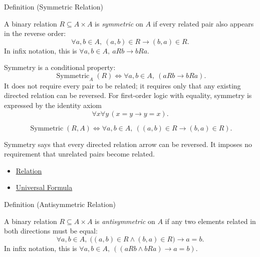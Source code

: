\begin{definitionbox}{Definition (Symmetric Relation)}
\begin{definition}\label{def:symmetric}
A binary relation $R\subseteq A\times A$ is \emph{symmetric} on $A$ if every
related pair also appears in the reverse order:
\[
  \forall a,b\in A,\ (a,b)\in R \rightarrow (b,a)\in R.
\]
In infix notation, this is $\forall a,b\in A,\ aRb\rightarrow bRa$.
\end{definition}
\end{definitionbox}


\begin{remark*}
Symmetry is a conditional property:
\[
  \operatorname{Symmetric}_A(R)
  \iff
  \forall a,b\in A,\ (aRb\rightarrow bRa).
\]
It does not require every pair to be related; it requires only that any
existing directed relation can be reversed. For first-order logic with
equality, symmetry is expressed by the identity axiom
\[
  \forall x\forall y\,(x=y\rightarrow y=x).
\]
\end{remark*}

\begin{remark*}
\[
  \operatorname{Symmetric}(R,A)
  \iff
  \forall a,b\in A,\ ((a,b)\in R \to (b,a)\in R).
\]
\end{remark*}

\begin{remark*}[Interpretation]
Symmetry says that every directed relation arrow can be reversed. It imposes
no requirement that unrelated pairs become related.
\end{remark*}

\begin{dependencies}
\begin{itemize}
  \item \hyperref[def:relation]{Relation}
  \item \hyperref[def:universal-q]{Universal Formula}
\end{itemize}
\end{dependencies}

\begin{definitionbox}{Definition (Antisymmetric Relation)}
\begin{definition}\label{def:antisymmetric}
A binary relation $R\subseteq A\times A$ is \emph{antisymmetric} on $A$ if any
two elements related in both directions must be equal:
\[
  \forall a,b\in A,\;
  \bigl((a,b)\in R\land(b,a)\in R\bigr)\rightarrow a=b.
\]
In infix notation, this is
$\forall a,b\in A,\ ((aRb\land bRa)\rightarrow a=b)$.
\end{definition}
\end{definitionbox}


